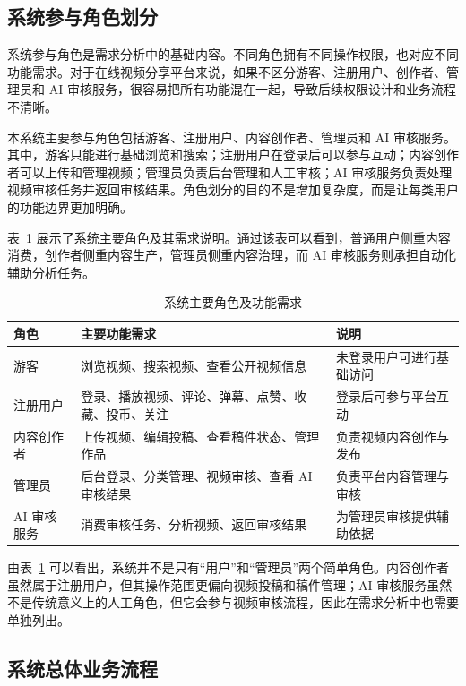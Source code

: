 \subsection{系统参与角色划分}
\label{subsec:system-actors}

系统参与角色是需求分析中的基础内容。不同角色拥有不同操作权限，也对应不同功能需求。对于在线视频分享平台来说，如果不区分游客、注册用户、创作者、管理员和 AI 审核服务，很容易把所有功能混在一起，导致后续权限设计和业务流程不清晰。

本系统主要参与角色包括游客、注册用户、内容创作者、管理员和 AI 审核服务。其中，游客只能进行基础浏览和搜索；注册用户在登录后可以参与互动；内容创作者可以上传和管理视频；管理员负责后台管理和人工审核；AI 审核服务负责处理视频审核任务并返回审核结果。角色划分的目的不是增加复杂度，而是让每类用户的功能边界更加明确。

表~\ref{tab:system-actors} 展示了系统主要角色及其需求说明。通过该表可以看到，普通用户侧重内容消费，创作者侧重内容生产，管理员侧重内容治理，而 AI 审核服务则承担自动化辅助分析任务。

\begin{table}[htbp]
  \centering
  \caption{系统主要角色及功能需求}
  \label{tab:system-actors}
  \begin{tabular}{p{}p{}p{}}
    \hline
    \textbf{角色} & \textbf{主要功能需求} & \textbf{说明} \\
    \hline
    游客 & 浏览视频、搜索视频、查看公开视频信息 & 未登录用户可进行基础访问 \\
    注册用户 & 登录、播放视频、评论、弹幕、点赞、收藏、投币、关注 & 登录后可参与平台互动 \\
    内容创作者 & 上传视频、编辑投稿、查看稿件状态、管理作品 & 负责视频内容创作与发布 \\
    管理员 & 后台登录、分类管理、视频审核、查看 AI 审核结果 & 负责平台内容管理与审核 \\
    AI 审核服务 & 消费审核任务、分析视频、返回审核结果 & 为管理员审核提供辅助依据 \\
    \hline
  \end{tabular}
\end{table}

由表~\ref{tab:system-actors} 可以看出，系统并不是只有“用户”和“管理员”两个简单角色。内容创作者虽然属于注册用户，但其操作范围更偏向视频投稿和稿件管理；AI 审核服务虽然不是传统意义上的人工角色，但它会参与视频审核流程，因此在需求分析中也需要单独列出。

\subsection{系统总体业务流程}
\label{subsec:overall-business-flow}

